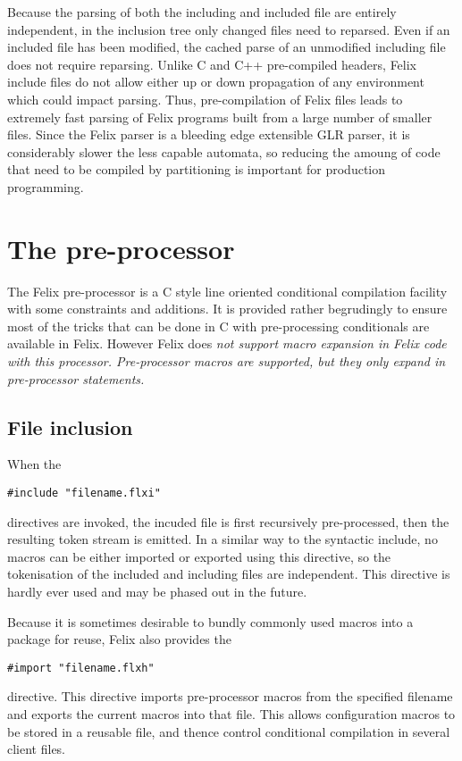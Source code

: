 \documentclass{report}
\begin{document}
Because the parsing of both the including and included file are
entirely independent, in the inclusion tree only changed files
need to reparsed. Even if an included file has been
modified, the cached parse of an unmodified including file
does not require reparsing. Unlike C and C++ pre-compiled headers,
Felix include files do not allow either up or down propagation
of any environment which could impact parsing. Thus, pre-compilation
of Felix files leads to extremely fast parsing of Felix programs
built from a large number of smaller files. Since the Felix parser
is a bleeding edge extensible GLR parser, it is considerably slower
the less capable automata, so reducing the amoung of code that
need to be compiled by partitioning is important for production
programming.

\section{The pre-processor}
The Felix pre-processor is a C style line oriented conditional
compilation facility with some constraints and additions.
It is provided rather begrudingly to ensure most of the tricks
that can be done in C with pre-processing conditionals are
available in Felix. However Felix does \em{not} support
macro expansion in Felix code with this processor.  
Pre-processor macros are supported, but they only expand
in pre-processor statements.

\subsection{File inclusion}
When the 
\begin{verbatim}
#include "filename.flxi"
\end{verbatim}
directives are invoked, the incuded file is first recursively pre-processed,
then the resulting token stream is emitted. In a similar way to
the syntactic include, no macros can be either imported or exported
using this directive, so the tokenisation of the included and including
files are independent. This directive is hardly ever used and may be phased
out in the future.

Because it is sometimes desirable to bundly commonly used macros into
a package for reuse, Felix also provides the
\begin{verbatim}
#import "filename.flxh"
\end{verbatim}
directive. This directive imports pre-processor macros from the specified filename
and exports the current macros into that file. This allows configuration 
macros to be stored in a reusable file, and thence control conditional
compilation in several client files.
\end{document}
